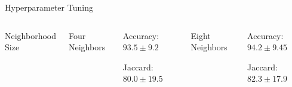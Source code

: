 \documentclass[compress,aspectratio=43]{beamer}
\begin{document}
\begin{frame}{Hyperparameter Tuning}
\begin{columns}[t]
\begin{center}
\vspace{-7mm}
{\scriptsize Neighborhood Size}\\
\end{center}
{\scriptsize Four Neighbors}
\begin{itemize}
{\scriptsize 
\item Accuracy: $93.5 \pm 9.2$
\item Jaccard: $80.0 \pm 19.5$
}
\end{itemize}

{\scriptsize Eight Neighbors}
\begin{itemize}
{\scriptsize 
\item Accuracy: $94.2 \pm 9.45$
\item Jaccard: $82.3 \pm 17.9$
}
\end{itemize}
\end{columns}
\end{frame}
\end{document}
